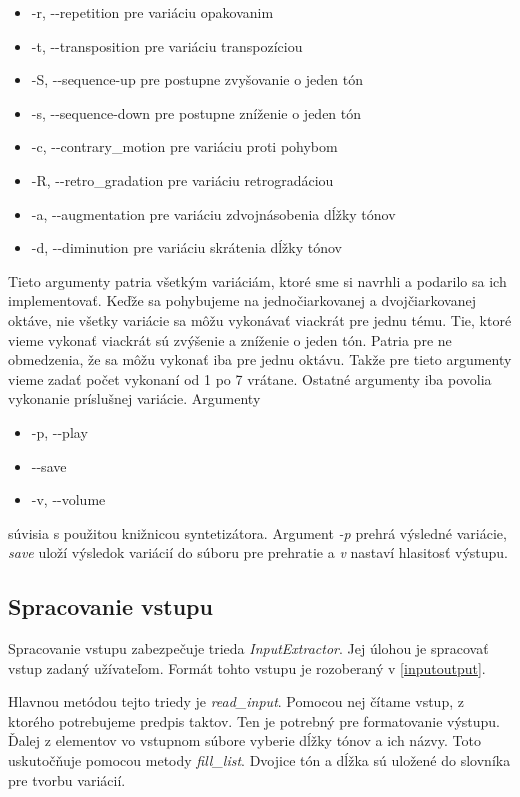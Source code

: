 \begin{itemize}\itemsep0.05em
    \item -r, -{}-repetition pre variáciu opakovanim
    \item -t, -{}-transposition pre variáciu transpozíciou
    \item -S, -{}-sequence-up pre postupne zvyšovanie o jeden tón
    \item -s, -{}-sequence-down pre postupne zníženie o jeden tón
    \item -c, -{}-contrary\_motion pre variáciu proti pohybom
    \item -R, -{}-retro\_gradation pre variáciu retrogradáciou
    \item -a, -{}-augmentation pre variáciu zdvojnásobenia dĺžky tónov
    \item -d, -{}-diminution pre variáciu skrátenia dĺžky tónov
\end{itemize}

Tieto argumenty patria všetkým variáciám, ktoré sme si navrhli a podarilo sa ich implementovať. Keďže sa pohybujeme na jednočiarkovanej a dvojčiarkovanej oktáve, nie všetky variácie sa môžu vykonávať viackrát pre jednu tému. Tie, ktoré vieme vykonať viackrát sú zvýšenie a zníženie o jeden tón. Patria pre ne obmedzenia, že sa môžu vykonať iba pre jednu oktávu. Takže pre tieto argumenty vieme zadať počet vykonaní od 1 po 7 vrátane. Ostatné argumenty iba povolia vykonanie príslušnej variácie. Argumenty

\begin{itemize}\itemsep0.05em
    \item -p, -{}-play 
    \item -{}-save
    \item -v, -{}-volume
\end{itemize}

súvisia s použitou knižnicou syntetizátora. Argument \textit{-p} prehrá výsledné variácie, \textit{save} uloží výsledok variácií do súboru pre prehratie a \textit{v} nastaví hlasitosť výstupu.

\subsection{Spracovanie vstupu}
Spracovanie vstupu zabezpečuje trieda \textit{InputExtractor}. Jej úlohou je spracovať vstup zadaný užívateľom. Formát tohto vstupu je rozoberaný v \ref{inputoutput}. 

Hlavnou metódou tejto triedy je \textit{read\_input}. Pomocou nej čítame vstup, z ktorého potrebujeme predpis taktov. Ten je potrebný pre formatovanie výstupu. Ďalej z elementov vo vstupnom súbore vyberie dĺžky tónov a ich názvy. Toto uskutočňuje pomocou metody \textit{fill\_list}. Dvojice tón a dĺžka sú uložené do slovníka pre tvorbu variácií.

